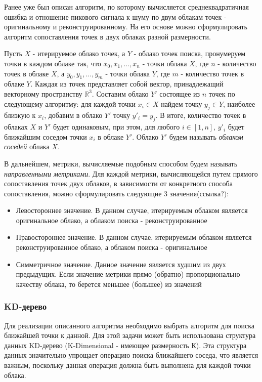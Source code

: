 Ранее уже был описан алгоритм, по которому вычисляется среднеквадратичная ошибка
и отношение пикового сигнала к шуму по двум облакам точек - оригинальному и
реконструированному. На его основе можно сформулировать алгоритм сопоставления
точек в двух облаках разной размерности.

Пусть $X$ - итерируемое облако точек, а $Y$ - облако точек поиска, пронумеруем
точки в каждом облаке так, что $x_{0}, x_{1}, \dots, x_{n}$ - точки облака $X$,
где $n$ - количество точек в облаке $X$, а $y_{0}, y_{1}, \dots, y_{m}$ - точки
облака $Y$, где $m$ - количество точек в облаке $Y$. Каждая из точек
представляет собой вектор, принадлежащий векторному пространству
$\mathbb{R}^{3}$. Составим облако $Y'$ состоящее из $n$ точек по следующему
алгоритму: для каждой точки $x_{i} \in X$ найдем точку $y_{j} \in Y$, наиболее
близкую к $x_{i}$, добавим в облако $Y'$ точку $y'_{i} = y_{j}$. В итоге,
количество точек в облаках $X$ и $Y'$ будет одинаковым, при этом, для любого $i
\in \left[1, n\right]$, $y'_{i}$ будет ближайшим соседом точки $x_{i}$ в облаке
$Y'$. Облако $Y'$ будем называть \textit{облаком соседей} облака $X$.

В дальнейшем, метрики, вычисляемые подобным способом будем называть
\textit{направленными метриками}. Для каждой метрики, вычисляющейся путем
прямого сопоставления точек двух облаков, в зависимости от конкретного способа
сопоставления, можно сформулировать следующие 3 значения(ссылка?):

\begin{itemize}
    \item Левостороннее значение. В данном случае, итерируемым облаком является
    оригинальное облако, а облаком поиска - реконструированное
    \item Правостороннее значение. В данном случае, итерируемым облаком является
    реконструированное облако, а облаком поиска - оригинальное
    \item Симметричное значение. Данное значение является худшим из двух
    предыдущих. Если значение метрики прямо (обратно) пропорционально качеству
    облака, то берется меньшее (большее) из значений
\end{itemize}

\subsubsection{KD-дерево}

Для реализации описанного алгоритма необходимо выбрать алгоритм для поиска
ближайшей точки к данной. Для этой задачи может быть использована структура
данных KD-дерево (K-Dimensional - имеющее размерность
К)\cite[23]{PointCloudAnalysis}. Эта структура данных значительно упрощает
операцию поиска ближайшего соседа, что является важным, поскольку данная
операция должна быть выполнена для каждой точки облака.

